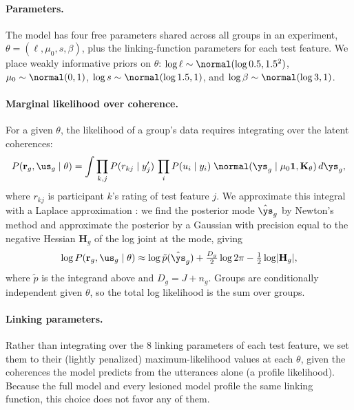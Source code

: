 \paragraph{Parameters.} The model has four free parameters shared across all
groups in an experiment, $\theta = (\ell, \mu_0, s, \beta)$, plus the
linking-function parameters for each test feature. We place weakly informative
priors on $\theta$:
$\log \ell \sim \normal(\log 0.5, 1.5^2)$,
$\mu_0 \sim \normal(0, 1)$,
$\log s \sim \normal(\log 1.5, 1)$, and
$\log \beta \sim \normal(\log 3, 1)$.

\paragraph{Marginal likelihood over coherence.} For a given $\theta$, the
likelihood of a group's data requires integrating over the latent coherences:
\begin{equation}
    P(\mathbf{r}_g, \us_g \mid \theta) = \int
        \prod_{k, j} P(r_{kj} \mid y'_j)\,
        \prod_{i} P(u_i \mid y_i)\;
        \normal(\ys_g \mid \mu_0\mathbf{1}, \mathbf{K}_\theta)\, d\ys_g,
\end{equation}
where $r_{kj}$ is participant $k$'s rating of test feature $j$. We approximate
this integral with a Laplace approximation \citep{rasmussenwilliams2006gaussian}:
we find the posterior mode $\hat{\ys}_g$ by Newton's method and approximate
the posterior by a Gaussian with precision equal to the negative Hessian
$\mathbf{H}_g$ of the log joint at the mode, giving
\begin{equation}
    \log P(\mathbf{r}_g, \us_g \mid \theta) \approx
        \log \tilde{p}(\hat{\ys}_g) + \tfrac{D_g}{2}\log 2\pi
        - \tfrac{1}{2}\log\lvert \mathbf{H}_g \rvert,
\end{equation}
where $\tilde{p}$ is the integrand above and $D_g = J + n_g$. Groups are
conditionally independent given $\theta$, so the total log likelihood is the
sum over groups.

\paragraph{Linking parameters.} Rather than integrating over the 8 linking
parameters of each test feature, we set them to their (lightly penalized)
maximum-likelihood values at each $\theta$, given the coherences the model
predicts from the utterances alone (a profile likelihood). Because the full
model and every lesioned model profile the same linking function, this choice
does not favor any of them.

